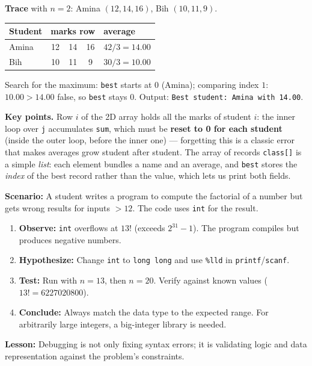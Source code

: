 \documentclass[11pt]{article}
\begin{document}
\begin{exoresolu}
\textbf{Trace} with $n = 2$: Amina $(12, 14, 16)$, Bih $(10, 11, 9)$.
\begin{center}
\begin{tabular}{|l|c|c|c|l|}
\hline
\rowcolor{popblueL} Student & \multicolumn{3}{c|}{marks row} & average \\ \hline
Amina & 12 & 14 & 16 & $42/3 = 14.00$ \\ \hline
Bih & 10 & 11 & 9 & $30/3 = 10.00$ \\ \hline
\end{tabular}
\end{center}
Search for the maximum: \texttt{best} starts at $0$ (Amina); comparing index $1$: $10.00 > 14.00$ false, so \texttt{best} stays $0$. Output: \texttt{Best student: Amina with 14.00}.

\textbf{Key points.} Row $i$ of the 2D array holds all the marks of student $i$: the inner loop over \texttt{j} accumulates \texttt{sum}, which must be \textbf{reset to 0 for each student} (inside the outer loop, before the inner one) — forgetting this is a classic error that makes averages grow student after student. The array of records \texttt{class[]} is a simple \emph{list}: each element bundles a name and an average, and \texttt{best} stores the \emph{index} of the best record rather than the value, which lets us print both fields.
\end{exoresolu}

\begin{experience}
\textbf{Scenario:} A student writes a program to compute the factorial of a number but gets wrong results for inputs $> 12$. The code uses \texttt{int} for the result.
\begin{enumerate}
\item \textbf{Observe:} \texttt{int} overflows at $13!$ (exceeds $2^{31}-1$). The program compiles but produces negative numbers.
\item \textbf{Hypothesize:} Change \texttt{int} to \texttt{long long} and use \texttt{\%lld} in \texttt{printf}/\texttt{scanf}.
\item \textbf{Test:} Run with $n=13$, then $n=20$. Verify against known values ($13! = 6227020800$).
\item \textbf{Conclude:} Always match the data type to the expected range. For arbitrarily large integers, a big-integer library is needed.
\end{enumerate}
\textbf{Lesson:} Debugging is not only fixing syntax errors; it is validating logic and data representation against the problem's constraints.
\end{experience}
\end{document}
